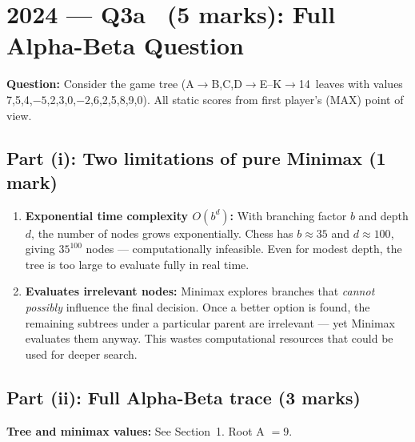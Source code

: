 \documentclass[12pt, a4paper]{article}
\newenvironment{answerbox}{\begin{mdframed}[style=answerframe]}{\end{mdframed}}
\begin{document}
\section{2024 --- Q3a \ \normalfont(5 marks): Full Alpha-Beta Question}

\textbf{Question:} Consider the game tree (A$\to$B,C,D$\to$E--K$\to$14~leaves with values 7,5,4,$-5$,2,3,0,$-2$,6,2,5,8,9,0). All static scores from first player's (MAX) point of view.

\subsection*{Part (i): Two limitations of pure Minimax (1 mark)}

\begin{answerbox}
\begin{enumerate}[noitemsep]
  \item \textbf{Exponential time complexity $O(b^d)$:} With branching factor $b$ and depth $d$, the number of nodes grows exponentially. Chess has $b \approx 35$ and $d \approx 100$, giving $35^{100}$ nodes --- computationally infeasible. Even for modest depth, the tree is too large to evaluate fully in real time.
  \item \textbf{Evaluates irrelevant nodes:} Minimax explores branches that \textit{cannot possibly} influence the final decision. Once a better option is found, the remaining subtrees under a particular parent are irrelevant --- yet Minimax evaluates them anyway. This wastes computational resources that could be used for deeper search.
\end{enumerate}
\end{answerbox}

\subsection*{Part (ii): Full Alpha-Beta trace (3 marks)}

\textbf{Tree and minimax values:} See Section~1. Root A $= 9$.
\end{document}
